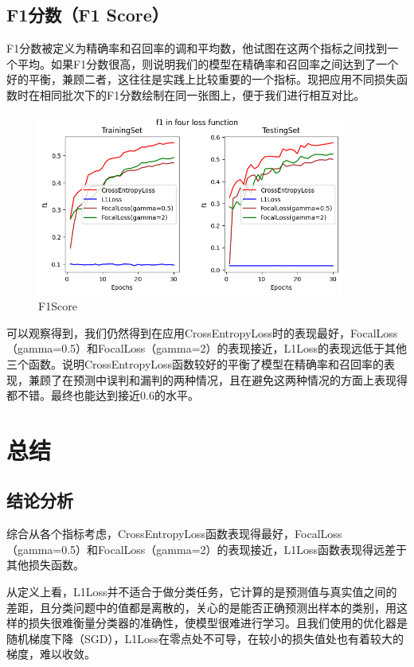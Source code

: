 \documentclass{article}
\begin{document}
\subsection{F1分数（F1 Score）}
F1分数被定义为精确率和召回率的调和平均数，他试图在这两个指标之间找到一个平均。如果F1分数很高，则说明我们的模型在精确率和召回率之间达到了一个好的平衡，兼顾二者，这往往是实践上比较重要的一个指标。现把应用不同损失函数时在相同批次下的F1分数绘制在同一张图上，便于我们进行相互对比。
\begin{figure}[H]
    \centering
    \includegraphics[width=0.9\textwidth]{Figure/F1Score.png}
    \caption{F1Score}
    \label{fig:F1Score}
\end{figure}
可以观察得到，我们仍然得到在应用CrossEntropyLoss时的表现最好，FocalLoss（gamma=0.5）和FocalLoss（gamma=2）的表现接近，L1Loss的表现远低于其他三个函数。说明CrossEntropyLoss函数较好的平衡了模型在精确率和召回率的表现，兼顾了在预测中误判和漏判的两种情况，且在避免这两种情况的方面上表现得都不错。最终也能达到接近0.6的水平。

\section{总结}
\subsection{结论分析}
综合从各个指标考虑，CrossEntropyLoss函数表现得最好，FocalLoss（gamma=0.5）和FocalLoss（gamma=2）的表现接近，L1Loss函数表现得远差于其他损失函数。

从定义上看，L1Loss并不适合于做分类任务，它计算的是预测值与真实值之间的差距，且分类问题中的值都是离散的，关心的是能否正确预测出样本的类别，用这样的损失很难衡量分类器的准确性，使模型很难进行学习。且我们使用的优化器是随机梯度下降（SGD），L1Loss在零点处不可导，在较小的损失值处也有着较大的梯度，难以收敛。
\end{document}
